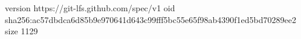 version https://git-lfs.github.com/spec/v1
oid sha256:ac57dbdca6d85b9e970641d643c99fff5bc55e65f98ab4390f1ed5bd70289ee2
size 1129
